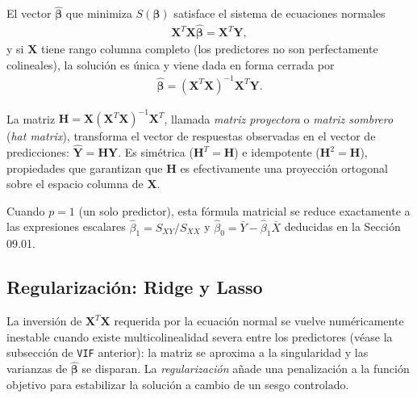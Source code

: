 \begin{teorema}
	El vector $\hat{\boldsymbol{\beta}}$ que minimiza $S(\boldsymbol{\beta})$ satisface el sistema de ecuaciones normales
	\begin{align}
		\mathbf{X}^T\mathbf{X}\hat{\boldsymbol{\beta}} = \mathbf{X}^T\mathbf{Y},
	\end{align}
	y si $\mathbf{X}$ tiene rango columna completo (los predictores no son perfectamente colineales), la solución es única y viene dada en forma cerrada por
	\begin{align}
		\hat{\boldsymbol{\beta}} = (\mathbf{X}^T\mathbf{X})^{-1}\mathbf{X}^T\mathbf{Y}.
	\end{align}
\end{teorema}

\begin{definicion}
	La matriz $\mathbf{H}=\mathbf{X}(\mathbf{X}^T\mathbf{X})^{-1}\mathbf{X}^T$, llamada \emph{matriz proyectora} o \emph{matriz sombrero} (\emph{hat matrix}), transforma el vector de respuestas observadas en el vector de predicciones: $\hat{\mathbf{Y}}=\mathbf{H}\mathbf{Y}$. Es simétrica ($\mathbf{H}^T=\mathbf{H}$) e idempotente ($\mathbf{H}^2=\mathbf{H}$), propiedades que garantizan que $\mathbf{H}$ es efectivamente una proyección ortogonal sobre el espacio columna de $\mathbf{X}$.
\end{definicion}

\begin{observacion}
	Cuando $p=1$ (un solo predictor), esta fórmula matricial se reduce exactamente a las expresiones escalares $\hat\beta_1=S_{XY}/S_{XX}$ y $\hat\beta_0=\bar Y-\hat\beta_1\bar X$ deducidas en la Sección 09.01.
\end{observacion}

\subsection{Regularización: Ridge y Lasso}

La inversión de $\mathbf{X}^T\mathbf{X}$ requerida por la ecuación normal se vuelve numéricamente inestable cuando existe multicolinealidad severa entre los predictores (véase la subsección de \texttt{VIF} anterior): la matriz se aproxima a la singularidad y las varianzas de $\hat{\boldsymbol{\beta}}$ se disparan. La \emph{regularización} añade una penalización a la función objetivo para estabilizar la solución a cambio de un sesgo controlado.

